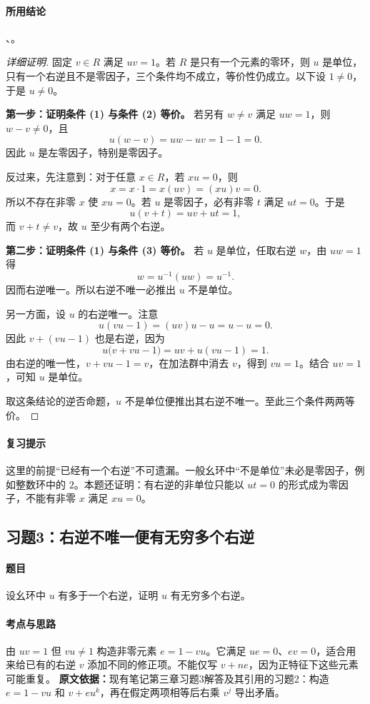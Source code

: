 \paragraph{所用结论}、。
\begin{proof}[详细证明]
固定 $v\in R$ 满足 $uv=1$。若 $R$ 是只有一个元素的零环，则 $u$ 是单位，只有一个右逆且不是零因子，三个条件均不成立，等价性仍成立。以下设 $1\ne0$，于是 $u\ne0$。

\textbf{第一步：证明条件 (1) 与条件 (2) 等价。}
若另有 $w\ne v$ 满足 $uw=1$，则 $w-v\ne0$，且
\[
u(w-v)=uw-uv=1-1=0.
\]
因此 $u$ 是左零因子，特别是零因子。

反过来，先注意到：对于任意 $x\in R$，若 $xu=0$，则
\[
x=x\cdot1=x(uv)=(xu)v=0.
\]
所以不存在非零 $x$ 使 $xu=0$。若 $u$ 是零因子，必有非零 $t$ 满足 $ut=0$。于是
\[
u(v+t)=uv+ut=1,
\]
而 $v+t\ne v$，故 $u$ 至少有两个右逆。

\textbf{第二步：证明条件 (1) 与条件 (3) 等价。}
若 $u$ 是单位，任取右逆 $w$，由 $uw=1$ 得
\[
w=u^{-1}(uw)=u^{-1}.
\]
因而右逆唯一。所以右逆不唯一必推出 $u$ 不是单位。

另一方面，设 $u$ 的右逆唯一。注意
\[
u(vu-1)=(uv)u-u=u-u=0.
\]
因此 $v+(vu-1)$ 也是右逆，因为
\[
u\bigl(v+vu-1\bigr)=uv+u(vu-1)=1.
\]
由右逆的唯一性，$v+vu-1=v$，在加法群中消去 $v$，得到 $vu=1$。结合 $uv=1$，可知 $u$ 是单位。

取这条结论的逆否命题，$u$ 不是单位便推出其右逆不唯一。至此三个条件两两等价。
\end{proof}

\paragraph{复习提示}
这里的前提“已经有一个右逆”不可遗漏。一般幺环中“不是单位”未必是零因子，例如整数环中的 $2$。本题还证明：有右逆的非单位只能以 $ut=0$ 的形式成为零因子，不能有非零 $x$ 满足 $xu=0$。

\subsection{习题3：右逆不唯一便有无穷多个右逆}\label{exercise:3:3}
\paragraph{题目}
设幺环中 $u$ 有多于一个右逆，证明 $u$ 有无穷多个右逆。

\paragraph{考点与思路}
由 $uv=1$ 但 $vu\ne1$ 构造非零元素 $e=1-vu$。它满足 $ue=0$、$ev=0$，适合用来给已有的右逆 $v$ 添加不同的修正项。不能仅写 $v+ne$，因为正特征下这些元素可能重复。
\textbf{原文依据：}现有笔记第三章习题3解答及其引用的习题2：构造 $e=1-vu$ 和 $v+eu^k$，再在假定两项相等后右乘 $v^j$ 导出矛盾。

